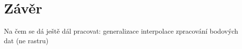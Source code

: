 \chapter{Závěr}
\label{5-zaver}

Na čem se dá ještě dál pracovat:
generalizace
interpolace
zpracování bodových dat (ne rastru)
